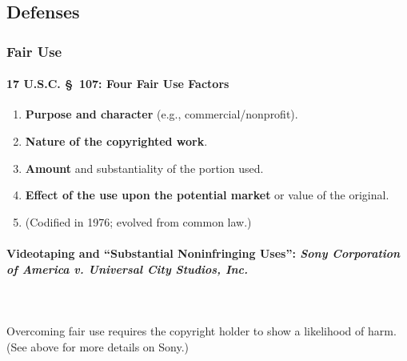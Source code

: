 \subsection{Defenses}

\subsubsection{Fair Use}

\paragraph{17 U.S.C. \S\ 107: Four Fair Use Factors}

\begin{enumerate}
    \item \textbf{Purpose and character} (e.g., commercial/nonprofit).
    \item \textbf{Nature of the copyrighted work}.
    \item \textbf{Amount} and substantiality of the portion used.
    \item \textbf{Effect of the use upon the potential market} or value of the 
    original.
    \item (Codified in 1976; evolved from common law.)
\end{enumerate}

\paragraph{Videotaping and ``Substantial Noninfringing Uses'': \emph{Sony 
Corporation of America v.  Universal City Studios, Inc.}}
~\\\\
Overcoming fair use requires the copyright holder to show a likelihood of 
harm. (See above for more details on Sony.)


